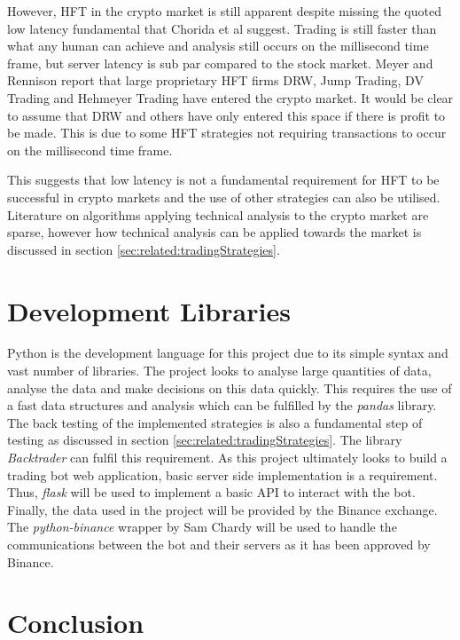 However, HFT in the crypto market is still apparent despite missing the quoted low latency fundamental that Chorida et al \cite{REPORT:ChordiaEtAl:2013} suggest. Trading is still faster than what any human can achieve and analysis still occurs on the millisecond time frame, but server latency is sub par compared to the stock market. Meyer and Rennison \cite{ART:Meyer:2017} report that large proprietary HFT firms DRW, Jump Trading, DV Trading and Hehmeyer Trading have entered the crypto market. It would be clear to assume that DRW and others have only entered this space if there is profit to be made. This is due to some HFT strategies not requiring transactions to occur on the millisecond time frame.

This suggests that low latency is not a fundamental requirement for HFT to be successful in crypto markets and the use of other strategies can also be utilised. Literature on algorithms applying technical analysis to the crypto market are sparse, however how technical analysis can be applied towards the market is discussed in section \ref{sec:related:tradingStrategies}.


\section{Development Libraries}
\label{sec:related:developmentLibraries}

Python is the development language for this project due to its simple syntax and vast number of libraries. The project looks to analyse large quantities of data, analyse the data and make decisions on this data quickly. This requires the use of a fast data structures and analysis which can be fulfilled by the \textit{pandas} \cite{pandas} library. The back testing of the implemented strategies is also a fundamental step of testing as discussed in section \ref{sec:related:tradingStrategies}. The library \textit{Backtrader} \cite{backtrader} can fulfil this requirement. As this project ultimately looks to build a trading bot web application, basic server side implementation is a requirement. Thus, \textit{flask} will be used to implement a basic API to interact with the bot. Finally, the data used in the project will be provided by the Binance exchange. The \textit{python-binance} wrapper by Sam Chardy \cite{chardy} will be used to handle the communications between the bot and their servers as it has been approved by Binance.



\section{Conclusion}
\label{sec:related:conclusion}

